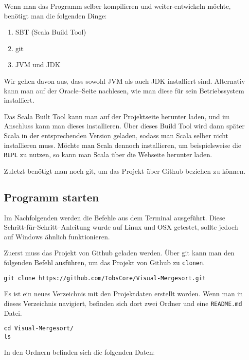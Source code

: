 Wenn man das Programm selber kompilieren und weiter-entwickeln möchte, benötigt man die folgenden Dinge:

\begin{enumerate}
\item SBT (Scala Build Tool)
\item git
\item JVM und JDK
\end{enumerate}

Wir gehen davon aus, dass sowohl JVM als auch JDK installiert sind. Alternativ kann man auf der Oracle--Seite\cite{OracleInstallJDK} nachlesen, wie man diese für sein Betriebssystem installiert.

Das Scala Built Tool kann man auf der Projektseite\cite{InstallSBT} herunter laden, und im Anschluss kann man dieses installieren. Über dieses Build Tool wird dann später Scala in der entsprechenden Version geladen, sodass man Scala selber nicht installieren muss. Möchte man Scala dennoch installieren, um beispielsweise die \texttt{REPL} \cite{GettingStartedWithTheScalaREPL} zu nutzen, so kann man Scala über die Webseite\cite{ScalaLang} herunter laden.

Zuletzt benötigt man noch git\cite{GitManual}, um das Projekt über Github beziehen zu können.

\subsection{Programm starten}

Im Nachfolgenden werden die Befehle aus dem Terminal ausgeführt. Diese Schritt-für-Schritt--Anleitung wurde auf Linux und OSX getestet, sollte jedoch auf Windows ähnlich funktionieren.

Zuerst muss das Projekt von Github geladen werden. Über git kann man den folgenden Befehl ausführen, um das Projekt von Github zu \texttt{clonen}.

\begin{verbatim}
git clone https://github.com/TobsCore/Visual-Mergesort.git
\end{verbatim}

Es ist ein neues Verzeichnis mit den Projektdaten erstellt worden. Wenn man in dieses Verzeichnis navigiert, befinden sich dort zwei Ordner und eine \texttt{README.md} Datei.

\begin{verbatim}
cd Visual-Mergesort/
ls
\end{verbatim}

In den Ordnern befinden sich die folgenden Daten:

